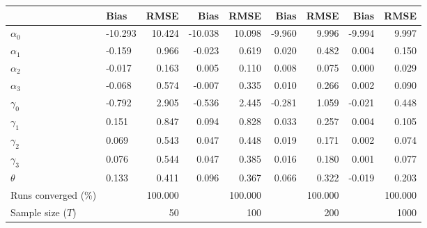 
\begin{tabular}[t]{llrrrrrrr}
\toprule
  & Bias & RMSE & Bias & RMSE & Bias & RMSE & Bias & RMSE\\
\midrule
$\alpha_{0}$ & -10.293 & 10.424 & -10.038 & 10.098 & -9.960 & 9.996 & -9.994 & 9.997\\
$\alpha_{1}$ & -0.159 & 0.966 & -0.023 & 0.619 & 0.020 & 0.482 & 0.004 & 0.150\\
$\alpha_{2}$ & -0.017 & 0.163 & 0.005 & 0.110 & 0.008 & 0.075 & 0.000 & 0.029\\
$\alpha_{3}$ & -0.068 & 0.574 & -0.007 & 0.335 & 0.010 & 0.266 & 0.002 & 0.090\\
$\gamma_{0}$ & -0.792 & 2.905 & -0.536 & 2.445 & -0.281 & 1.059 & -0.021 & 0.448\\
$\gamma_{1}$ & 0.151 & 0.847 & 0.094 & 0.828 & 0.033 & 0.257 & 0.004 & 0.105\\
$\gamma_{2}$ & 0.069 & 0.543 & 0.047 & 0.448 & 0.019 & 0.171 & 0.002 & 0.074\\
$\gamma_{3}$ & 0.076 & 0.544 & 0.047 & 0.385 & 0.016 & 0.180 & 0.001 & 0.077\\
$\theta$ & 0.133 & 0.411 & 0.096 & 0.367 & 0.066 & 0.322 & -0.019 & 0.203\\
Runs converged (\%) &  & 100.000 &  & 100.000 &  & 100.000 &  & 100.000\\
Sample size ($T$) &  & 50 &  & 100 &  & 200 &  & 1000\\
\bottomrule
\end{tabular}
